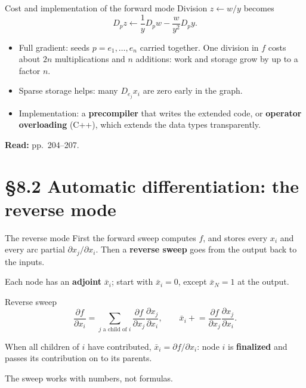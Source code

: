 \documentclass[12pt,aspectratio=169]{beamer}
\newcommand{\readpp}[1]{{\color{red!80!black}\textbf{Read:} #1}}
\newcommand{\xb}{\bar x}
\begin{document}
\begin{frame}{Cost and implementation of the forward mode}
  Division $z\leftarrow w/y$ becomes
  \begin{equation}
    D_pz \leftarrow \frac1y D_pw - \frac{w}{y^2}D_py. \tag{8.30}
  \end{equation}
  \begin{itemize}
    \item Full gradient: seeds $p=e_1,\dots,e_n$ carried together.
      One division in $f$ costs about $2n$ multiplications and $n$ additions:
      \alert{work and storage grow by up to a factor $n$.}
    \item Sparse storage helps: many $D_{e_j}x_i$ are zero early in the graph.
    \item Implementation: a \textbf{precompiler} that writes the extended code, or
      \textbf{operator overloading} (C++), which extends the data types transparently.
  \end{itemize}
  \readpp{pp.~204--207.}
\end{frame}

\section{\S8.2 Automatic differentiation: the reverse mode}

\begin{frame}{The reverse mode}
  First the forward sweep computes $f$, and stores every $x_i$ and every arc partial $\partial x_j/\partial x_i$.
  Then a \textbf{reverse sweep} goes from the output back to the inputs.

  Each node has an \textbf{adjoint} $\xb_i$; start with $\xb_i=0$, except $\xb_N=1$ at the output.
  \begin{block}{Reverse sweep}
    \vspace{-1ex}
    \begin{equation}
      \frac{\partial f}{\partial x_i} = \sum_{j\text{ a child of }i}\frac{\partial f}{\partial x_j}\frac{\partial x_j}{\partial x_i},
      \qquad
      \xb_i \mathrel{+}= \frac{\partial f}{\partial x_j}\frac{\partial x_j}{\partial x_i}. \tag{8.31, 8.32}
    \end{equation}
  \end{block}
  When all children of $i$ have contributed, $\xb_i=\partial f/\partial x_i$: node $i$ is \textbf{finalized}
  and passes its contribution on to its parents.

  The sweep works with \alert{numbers, not formulas.}
\end{frame}
\end{document}
